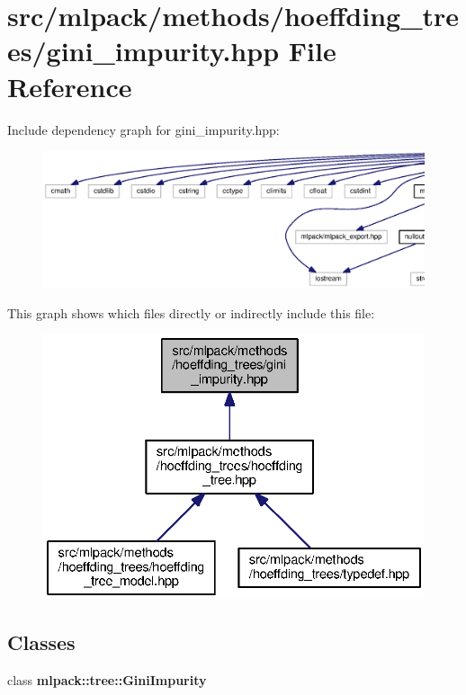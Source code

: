 \section{src/mlpack/methods/hoeffding\+\_\+trees/gini\+\_\+impurity.hpp File Reference}
\label{gini__impurity_8hpp}
Include dependency graph for gini\+\_\+impurity.\+hpp\+:
\nopagebreak
\begin{figure}[H]
\begin{center}
\leavevmode
\includegraphics[width=350pt]{gini__impurity_8hpp__incl}
\end{center}
\end{figure}
This graph shows which files directly or indirectly include this file\+:
\nopagebreak
\begin{figure}[H]
\begin{center}
\leavevmode
\includegraphics[width=332pt]{gini__impurity_8hpp__dep__incl}
\end{center}
\end{figure}
\subsection*{Classes}
\begin{DoxyCompactItemize}
\item 
class {\bf mlpack\+::tree\+::\+Gini\+Impurity}
\end{DoxyCompactItemize}
